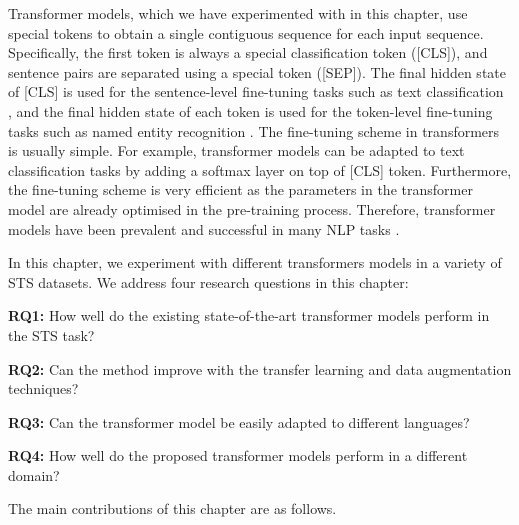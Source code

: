 Transformer models, which we have experimented with in this chapter, use special tokens to obtain a single contiguous sequence for each input sequence. Specifically, the first token is always a special classification token (\textsc{[CLS]}), and sentence pairs are separated using a special token (\textsc{[SEP]}). The final hidden state of \textsc{[CLS]}  is used for the sentence-level fine-tuning tasks such as text classification \autocite{10.1007/978-3-030-32381-3_16, ranasinghe-hettiarachchi-2020-brums}, and the final hidden state of each token is used for the token-level fine-tuning tasks such as named entity recognition \autocite{taher-etal-2019-beheshti, ranasinghe-etal-2021-wlv,jia-etal-2020-entity}. The fine-tuning scheme in transformers is usually simple. For example, transformer models can be adapted to text classification tasks by adding a softmax layer on top of \textsc{[CLS]} token. Furthermore, the fine-tuning scheme is very efficient as the parameters in the transformer model are already optimised in the pre-training process. Therefore, transformer models have been prevalent and successful in many NLP tasks \autocite{devlin-etal-2019-bert}. 

In this chapter, we experiment with different transformers models in a variety of STS datasets. 
We address four research questions in this chapter:

\textbf{RQ1:} How well do the existing state-of-the-art transformer models perform in the STS task? 

\textbf{RQ2:} Can the method improve with the transfer learning and data augmentation techniques?

\textbf{RQ3:} Can the transformer model be easily adapted to different languages?

\textbf{RQ4:} How well do the proposed transformer models perform in a different domain? 

The main contributions of this chapter are as follows.

